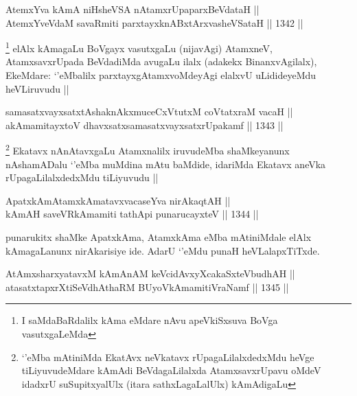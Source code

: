 \begin{shl}
AtemxYva kAmA niHsheVSA nA\s \s tamxrUpaparxBeVdataH || \\
AtemxYveVdaM savaRmiti parxtayxknABxtArxvasheVSataH ||  1342 ||  
\end{shl}

\begin{artha}
\footnote{I saMdaBaRdalilx kAma eMdare nAvu apeVkiSxsuva BoVga vasutxgaLeMda}
elAlx kAmagaLu BoVgayx vasutxgaLu (nijavAgi) AtamxneV, AtamxsavxrUpada BeVdadiMda avugaLu ilalx (adakekx BinanxvAgilalx), EkeMdare: `\stext'eMbalilx parxtayxgAtamxvoMdeyAgi elalxvU uLidideyeMdu heVLiruvudu ||
\end{artha}


\begin{shl}
samasatxvayxsatxtAshaknAkxmuceCxVtutxM coVtatxraM vacaH || \\
akAmamitayxtoV dhavxsatxsamasatxvayxsatxrUpakamf ||  1343 ||  
\end{shl}

\begin{artha}
\footnote{`\stext'eMba mAtiniMda EkatAvx neVkatavx rUpagaLilalxdedxMdu heVge tiLiyuvudeMdare kAmAdi BeVdagaLilalxda AtamxsavxrUpavu oMdeV idadxrU suSupitxyalUlx (itara sathxLagaLalUlx) kAmAdigaLu}
Ekatavx nAnAtavxgaLu Atamxnalilx iruvudeMba shaMkeyanunx nAshamADalu `\stext'eMba muMdina mAtu baMdide, idariMda Ekatavx aneVka rUpagaLilalxdedxMdu tiLiyuvudu ||
\end{artha}

\begin{shl}
ApatxkAmAtamxkAmatavxvacaseYva nirAkaqtAH || \\
kAmAH saveVR\s kAmamiti tathA\s pi punarucayxteV ||  1344 ||  
\end{shl}

\begin{artha}
punarukitx shaMke ApatxkAma, AtamxkAma eMba mAtiniMdale elAlx kAmagaLanunx nirAkarisiye ide. AdarU `\stext'eMdu punaH heVLalapxTiTxde.
\end{artha}


\begin{shl}
AtAmxsharxyatavxM kAmAnAM keVcidAvxyXcakaSxteV\s budhAH || \\
atasatxtapxrXtiSeVdhAthaRM BUyoV\s kAmamitiVraNamf ||  1345 ||  
\end{shl}


